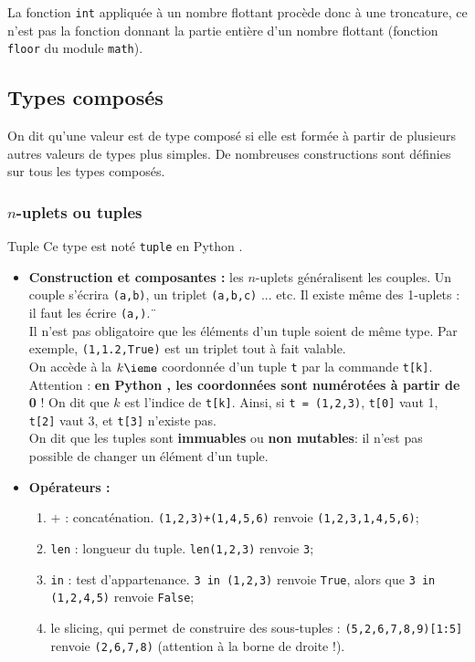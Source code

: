La fonction \texttt{int} appliquée à un nombre flottant procède donc à une troncature, ce n'est pas la fonction donnant la partie entière d'un nombre flottant (fonction \texttt{floor} du module \texttt{math}).

\subsection{Types composés}
\begin{defi}{}
On dit qu'une valeur est de type composé si elle est formée à partir de plusieurs autres 
valeurs de types plus simples. De nombreuses constructions sont définies sur tous les types 
composés.
\end{defi}

\subsubsection{$n$-uplets ou tuples}

\begin{defi}{Tuple}
Ce type est noté \texttt{tuple} en Python .
\begin{itemize}
\item \textbf{Construction et composantes :} les $n$-uplets généralisent les couples. Un couple s'écrira \texttt{(a,b)}, un triplet 
\texttt{(a,b,c)} ... etc. Il existe même des 1-uplets : il faut les écrire \texttt{(a,)}.¨\\%
Il n'est pas obligatoire que les éléments d'un tuple soient de même type. Par exemple, 
\texttt{(1,1.2,True)} est un triplet tout à fait valable.\\
On accède à la $k\ieme$ coordonnée d'un tuple \texttt{t} par la commande \texttt{t[k]}. Attention : 
\textbf{en Python , les coordonnées sont numérotées à partir de 0} ! On dit que $k$ est 
l'{indice} de \texttt{t[k]}. Ainsi, si \texttt{t = (1,2,3)}, \texttt{t[0]} vaut 1, 
\texttt{t[2]} vaut 3, et \texttt{t[3]} n'existe pas.\\
On dit que les tuples sont \textbf{immuables} ou \textbf{non mutables}: il n'est pas possible de changer un élément d'un 
tuple.
\item \textbf{Opérateurs :}
\begin{enumerate}
 \item $+$ : concaténation. \texttt{(1,2,3)+(1,4,5,6)} renvoie \texttt{(1,2,3,1,4,5,6)};
 \item \texttt{len} : {longueur} du tuple. \texttt{len(1,2,3)} renvoie \texttt{3};
 \item \texttt{in} : test d'appartenance. \texttt{3 in (1,2,3)} renvoie \texttt{True}, alors que 
\texttt{3 in (1,2,4,5)} renvoie \texttt{False};
\item le {slicing}, qui permet de construire des sous-tuples : \texttt{(5,2,6,7,8,9)[1:5]} 
renvoie \texttt{(2,6,7,8)} (attention à la borne de droite !).\\
\end{enumerate}
\end{itemize}
\end{defi}

